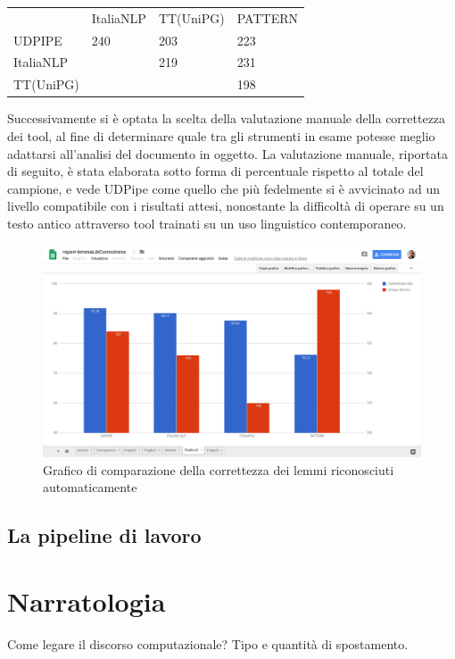 \begin{longtable}[]{@{}llll@{}}
\toprule
& ItaliaNLP & TT(UniPG) & PATTERN\tabularnewline
UDPIPE & 240 & 203 & 223\tabularnewline
ItaliaNLP & & 219 & 231\tabularnewline
TT(UniPG) & & & 198\tabularnewline
\bottomrule
\end{longtable}

Successivamente si è optata la scelta della valutazione manuale della
correttezza dei tool, al fine di determinare quale tra gli strumenti in
esame potesse meglio adattarsi all'analisi del documento in oggetto. La
valutazione manuale, riportata di seguito, è stata elaborata sotto forma
di percentuale rispetto al totale del campione, e vede UDPipe come
quello che più fedelmente si è avvicinato ad un livello compatibile con
i risultati attesi, nonostante la difficoltà di operare su un testo
antico attraverso tool trainati su un uso linguistico contemporaneo.

\begin{figure}
\centering
\includegraphics[width=1.00000\textwidth]{../charts/correctnessLibLemma2.png}
\caption{Grafico di comparazione della correttezza dei lemmi
riconosciuti automaticamente}
\end{figure}

\subsection{La pipeline di lavoro}\label{la-pipeline-di-lavoro}

\section{Narratologia}\label{narratologia}

 Come legare il discorso computazionale? Tipo e quantità di spostamento.

